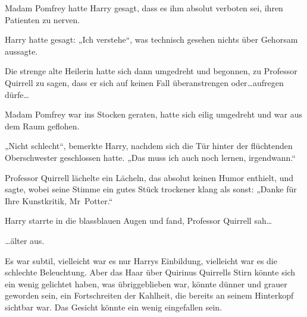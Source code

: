 Madam Pomfrey hatte Harry gesagt, dass es ihm absolut verboten sei, ihren Patienten zu nerven.

Harry hatte gesagt: „Ich verstehe“, was technisch gesehen nichts über Gehorsam aussagte.

Die strenge alte Heilerin hatte sich dann umgedreht und begonnen, zu Professor Quirrell zu sagen, dass er sich auf keinen Fall überanstrengen oder…aufregen dürfe…

Madam Pomfrey war ins Stocken geraten, hatte sich eilig umgedreht und war aus dem Raum geflohen.

„Nicht schlecht“, bemerkte Harry, nachdem sich die Tür hinter der flüchtenden Oberschwester geschlossen hatte. „Das muss ich auch noch lernen, irgendwann.“

Professor Quirrell lächelte ein Lächeln, das absolut keinen Humor enthielt, und sagte, wobei seine Stimme ein gutes Stück trockener klang als sonst: „Danke für Ihre Kunstkritik, Mr~Potter.“

Harry starrte in die blassblauen Augen und fand, Professor Quirrell sah…

…älter aus.

Es war subtil, vielleicht war es nur Harrys Einbildung, vielleicht war es die schlechte Beleuchtung. Aber das Haar über Quirinus Quirrells Stirn könnte sich ein wenig gelichtet haben, was übriggeblieben war, könnte dünner und grauer geworden sein, ein Fortschreiten der Kahlheit, die bereits an seinem Hinterkopf sichtbar war. Das Gesicht könnte ein wenig eingefallen sein.

